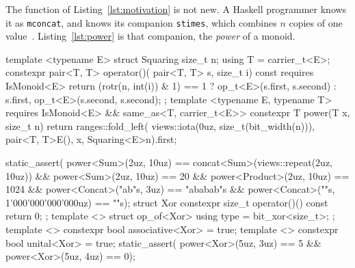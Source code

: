 The function of Listing~\ref{lst:motivation} is not new.
A Haskell programmer knows it as \texttt{mconcat}, and knows its companion \texttt{stimes}, which combines $n$ copies of one value~\cite{ghc2025semigroup}.
Listing~\ref{lst:power} is that companion, the \emph{power} of a monoid.

\begin{listing}[tp]
\begin{minipage}[t]{0.48\linewidth}
\begin{cpp}
template <typename E>
struct Squaring { size_t n;
  using T = carrier_t<E>;
  constexpr pair<T, T> operator()(
      pair<T, T> s, size_t i) const
    requires IsMonoid<E> {
    return {(rotr(n, int(i)) & 1) == 1
                ? op_t<E>{}(s.first, s.second)
                : s.first,
            op_t<E>{}(s.second, s.second)}; } };
template <typename E, typename T>
  requires IsMonoid<E> &&
           same_as<T, carrier_t<E>>
constexpr T power(T x, size_t n) {
  return ranges::fold_left(
      views::iota(0uz, size_t(bit_width(n))),
      pair<T, T>{E{}(), x},
      Squaring<E>{n}).first; }
\end{cpp}
\end{minipage}\hspace{0.04\linewidth}%
\begin{minipage}[t]{0.48\linewidth}
\begin{cpp}
static_assert(
power<Sum>(2uz, 10uz) ==
concat<Sum>(views::repeat(2uz, 10uz)) &&
power<Sum>(2uz, 10uz) == 20 &&
power<Product>(2uz, 10uz) == 1024 &&
power<Concat>("ab"s, 3uz) == "ababab"s &&
power<Concat>(""s, 1'000'000'000'000uz)
    == ""s);
struct Xor { constexpr size_t
  operator()() const { return 0; } };
template <> struct op_of<Xor> {
  using type = bit_xor<size_t>; };
template <> constexpr bool
associative<Xor> = true;
template <> constexpr bool
unital<Xor> = true;
static_assert(
power<Xor>(5uz, 3uz) == 5 &&
power<Xor>(5uz, 4uz) == 0);
\end{cpp}
\end{minipage}


\end{listing}
